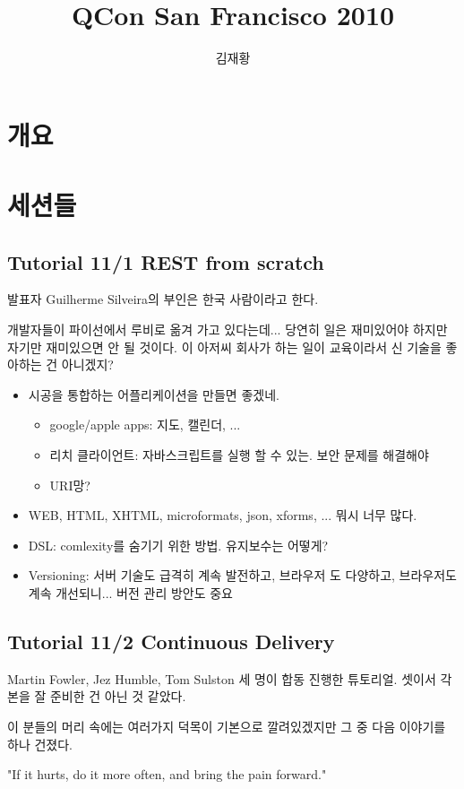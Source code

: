 \documentclass[a4paper]{article}
\title{QCon San Francisco 2010}
\author{김재황}
\begin{document}
\section{개요}

\section{세션들}

\subsection{Tutorial 11/1 REST from scratch}
 
발표자 Guilherme Silveira의 부인은 한국 사람이라고 한다.
 
개발자들이 파이선에서 루비로 옮겨 가고 있다는데... 당연히 일은
재미있어야 하지만 자기만 재미있으면 안 될 것이다. 이 아저씨 회사가 하는
일이 교육이라서 신 기술을 좋아하는 건 아니겠지?
\begin{itemize}
\item 시공을 통합하는 어플리케이션을 만들면 좋겠네.
  \begin{itemize}
  \item google/apple apps: 지도, 캘린더, ...
  \item 리치 클라이언트: 자바스크립트를 실행 할 수 있는. 보안 문제를
    해결해야
  \item URI망?
  \end{itemize}
\item  WEB, HTML, XHTML, microformats, json, xforms, ... 뭐시 너무 많다.
\item DSL: comlexity를 숨기기 위한 방법. 유지보수는 어떻게?
\item Versioning: 서버 기술도 급격히 계속 발전하고, 브라우저 도
  다양하고, 브라우저도 계속 개선되니... 버전 관리 방안도 중요
\end{itemize}

\subsection{Tutorial 11/2 Continuous Delivery}

Martin Fowler, Jez Humble, Tom Sulston 세 명이 합동 진행한 튜토리얼.
셋이서 각본을 잘 준비한 건 아닌 것 같았다.
 
이 분들의 머리 속에는 여러가지 덕목이 기본으로 깔려있겠지만 그 중 다음
이야기를 하나 건졌다.
 
"If it hurts, do it more often, and bring the pain forward."
 
\end{document}
